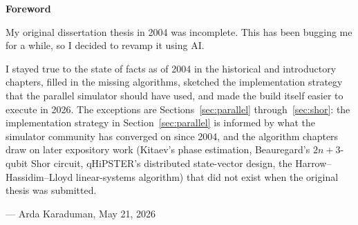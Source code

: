 \newpage
\vspace*{\fill}
\begin{center}
{\bf Foreword}
\end{center}

My original dissertation thesis in 2004 was incomplete. This has been bugging me for a while, so I decided to revamp it using AI.

I stayed true to the state of facts as of 2004 in the historical and introductory chapters, filled in the missing algorithms, sketched the implementation strategy that the parallel simulator should have used, and made the build itself easier to execute in 2026. The exceptions are Sections~\ref{sec:parallel} through~\ref{sec:shor}: the implementation strategy in Section~\ref{sec:parallel} is informed by what the simulator community has converged on since 2004, and the algorithm chapters draw on later expository work (Kitaev's phase estimation, Beauregard's $2n+3$-qubit Shor circuit, qHiPSTER's distributed state-vector design, the Harrow--Hassidim--Lloyd linear-systems algorithm) that did not exist when the original thesis was submitted.

\vspace{1\bigskipamount}

\hfill --- Arda Karaduman, May 21, 2026
\vspace*{\fill}
